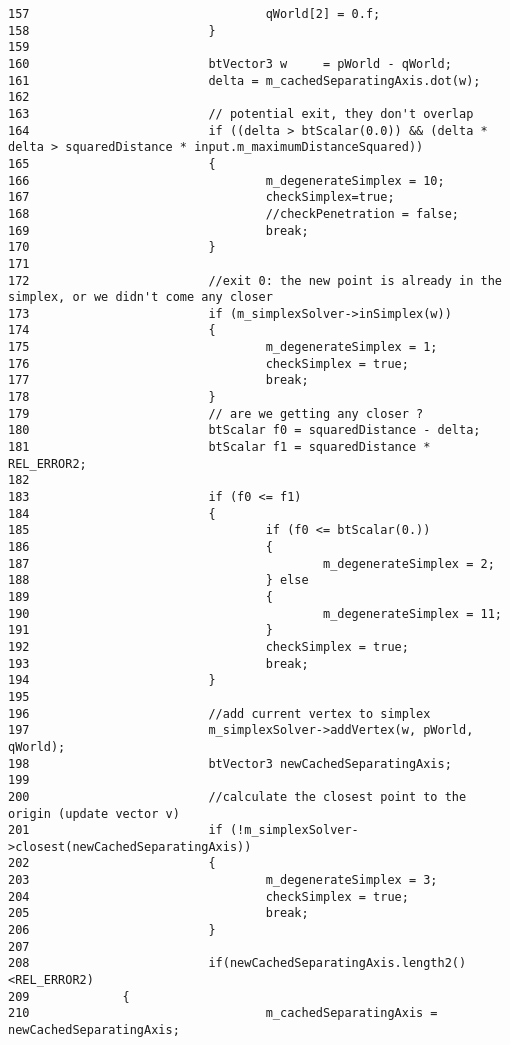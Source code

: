 \begin{Code}
\begin{verbatim}
157                                 qWorld[2] = 0.f;
158                         }
159 
160                         btVector3 w     = pWorld - qWorld;
161                         delta = m_cachedSeparatingAxis.dot(w);
162 
163                         // potential exit, they don't overlap
164                         if ((delta > btScalar(0.0)) && (delta * delta > squaredDistance * input.m_maximumDistanceSquared)) 
165                         {
166                                 m_degenerateSimplex = 10;
167                                 checkSimplex=true;
168                                 //checkPenetration = false;
169                                 break;
170                         }
171 
172                         //exit 0: the new point is already in the simplex, or we didn't come any closer
173                         if (m_simplexSolver->inSimplex(w))
174                         {
175                                 m_degenerateSimplex = 1;
176                                 checkSimplex = true;
177                                 break;
178                         }
179                         // are we getting any closer ?
180                         btScalar f0 = squaredDistance - delta;
181                         btScalar f1 = squaredDistance * REL_ERROR2;
182 
183                         if (f0 <= f1)
184                         {
185                                 if (f0 <= btScalar(0.))
186                                 {
187                                         m_degenerateSimplex = 2;
188                                 } else
189                                 {
190                                         m_degenerateSimplex = 11;
191                                 }
192                                 checkSimplex = true;
193                                 break;
194                         }
195 
196                         //add current vertex to simplex
197                         m_simplexSolver->addVertex(w, pWorld, qWorld);
198                         btVector3 newCachedSeparatingAxis;
199 
200                         //calculate the closest point to the origin (update vector v)
201                         if (!m_simplexSolver->closest(newCachedSeparatingAxis))
202                         {
203                                 m_degenerateSimplex = 3;
204                                 checkSimplex = true;
205                                 break;
206                         }
207 
208                         if(newCachedSeparatingAxis.length2()<REL_ERROR2)
209             {
210                                 m_cachedSeparatingAxis = newCachedSeparatingAxis;

\end{verbatim}
\end{Code}
